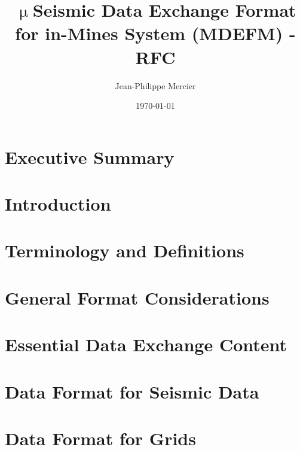 \documentclass[12pt]{article}
\begin{document}
\title{$\upmu$Seismic Data Exchange Format for in-Mines System (MDEFM) - RFC}
\author{Jean-Philippe Mercier}
\date{\today}
\maketitle

\newpage
\section*{Executive Summary}

\lipsum[1-2] %

\newpage

\tableofcontents
\pagebreak

\section{Introduction}


\section{Terminology and Definitions}


\section{General Format Considerations}


\section{Essential Data Exchange Content}


\section{Data Format for Seismic Data}


\section{Data Format for Grids}


% 
\end{document}
